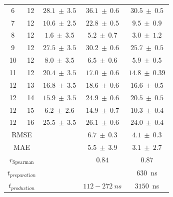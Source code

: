 \begin{table}[H]
\begin{center}
\begin{tabular}{ | c c |c |c|c|}
        6 &  12 &   $28.1 ~\pm~ 3.5$ \cite{Rizzo2006}  &  $36.1 ~\pm~ 0.6$ & $  30.5 ~\pm~ 0.5 $\\
        7 &  12 &   $10.6 ~\pm~ 2.5$ \cite{Guthrie2009,Rizzo2006} &  $22.8 ~\pm~ 0.5$ &  $  9.5 ~\pm~ 0.9 $\\
        8 &  12 &   $ 1.6 ~\pm~ 3.5$ \cite{Mobley2014,Rizzo2006} &  $ 5.2 ~\pm~ 0.7$ &  $ 3.0 ~\pm~ 1.2 $\\
        9 &  12 &   $27.5 ~\pm~ 3.5$ \cite{Rizzo2006}  &  $30.2 ~\pm~ 0.6$ &  $ 25.7 ~\pm~ 0.5 $\\
        10 &  12 &   $ 8.0 ~\pm~ 3.5$ \cite{Rizzo2006}  &  $ 6.5 ~\pm~ 0.6$ &  $  5.9 ~\pm~ 0.5 $\\
        11 &  12 &   $20.4  ~\pm~ 3.5$ \cite{Wolfenden1987,Rizzo2006}&  $17.0 ~\pm~ 0.6$ &  $ 14.8 ~\pm~ 0.39 $\\
        12 &  13 &   $16.8 ~\pm~ 3.5$ \cite{Rizzo2006} &  $18.6 ~\pm~ 0.6$ &  $ 16.6 ~\pm~ 0.5 $\\
        12 &  14 &   $15.9 ~\pm~ 3.5$ \cite{Rizzo2006}&  $24.9 ~\pm~ 0.6$ &  $ 20.5 ~\pm~ 0.5 $\\
        12 &  15 &    $6.2 ~\pm~ 2.6$ \cite{Rizzo2006, Nicholls2008}  &  $14.9 ~\pm~ 0.7$ &  $ 10.3 ~\pm~ 0.4 $\\
        12 &  16 &   $25.5 ~\pm~ 3.5$ \cite{Rizzo2006} &  $26.1 ~\pm~ 0.6$ &   $ 24.0 ~\pm~ 0.4 $\\
  \hline
        \multicolumn{2}{|c|}{RMSE} &          & $6.7 ~\pm~ 0.3$ & $4.1 ~\pm~ 0.3 $\\
        \multicolumn{2}{|c|}{MAE} &           & $5.5 ~\pm~ 3.9$ & $3.1 ~\pm~ 2.7$ \\
        \multicolumn{2}{|c|}{$r_{\text{Spearman}}$} &  & $0.84$ & $0.87$  \\
        \multicolumn{2}{|c|}{$t_{preparation}$} & & &  $630$~ns \\
        \multicolumn{2}{|c|}{$t_{production}$} & &$112 - 272~ns$ &  $3150$~ns \\
        \hline
\end{tabular}
\end{center}
\label{SITab: FE_M030_Graph}
\end{table}

